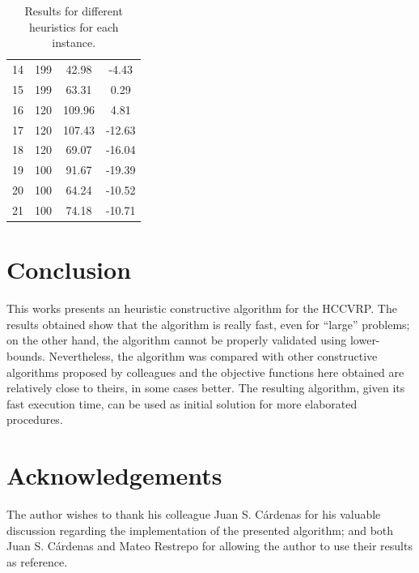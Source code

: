 \documentclass[10pt,twoside]{article}
\begin{document}
\begin{table}[H]
\begin{tabular}{cccc}
14                & 199            & 42.98            & -4.43           \\
15                & 199            & 63.31            & 0.29            \\
16                & 120            & 109.96           & 4.81            \\
17                & 120            & 107.43           & -12.63          \\
18                & 120            & 69.07            & -16.04          \\
19                & 100            & 91.67            & -19.39          \\
20                & 100            & 64.24            & -10.52          \\
21                & 100            & 74.18            & -10.71          \\ \hline
\end{tabular}
\caption{Results for different heuristics for each instance.}
\label{tab:otherRes}
\end{table}
\section{Conclusion}
This works presents an heuristic constructive algorithm for the HCCVRP. The results obtained show that the algorithm is really fast, even for ``large'' problems; on the other hand, the algorithm cannot be properly validated using lower-bounds. Nevertheless, the algorithm was compared with other constructive algorithms proposed by colleagues and the objective functions here obtained are relatively close to theirs, in some cases better. The resulting algorithm, given its fast execution time, can be used as initial solution for more elaborated procedures.



\section*{Acknowledgements}
The author wishes to thank his colleague Juan S. Cárdenas for his valuable discussion regarding the implementation of the presented algorithm; and both Juan S. Cárdenas and Mateo Restrepo for allowing the author to use their results as reference.


{\small


}
\end{document}
